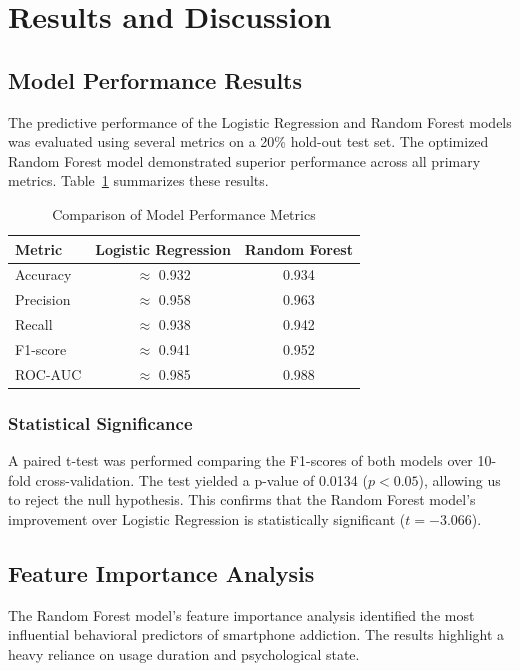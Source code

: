 \section{Results and Discussion}
\label{sec:results_discussion}

\subsection{Model Performance Results}
The predictive performance of the Logistic Regression and Random Forest models was evaluated using several metrics on a 20\% hold-out test set. The optimized Random Forest model demonstrated superior performance across all primary metrics. Table~\ref{tab:model_comparison} summarizes these results.

\begin{table}[h]
\centering
\caption{Comparison of Model Performance Metrics}
\label{tab:model_comparison}
\begin{tabular}{lcc}
\hline
\textbf{Metric} & \textbf{Logistic Regression} & \textbf{Random Forest} \\ \hline
Accuracy         & $\approx$ 0.932             & 0.934                  \\
Precision        & $\approx$ 0.958             & 0.963                  \\
Recall           & $\approx$ 0.938             & 0.942                  \\
F1-score         & $\approx$ 0.941             & 0.952                  \\
ROC-AUC          & $\approx$ 0.985             & 0.988                  \\ \hline
\end{tabular}
\end{table}

\subsubsection{Statistical Significance}
A paired t-test was performed comparing the F1-scores of both models over 10-fold cross-validation. The test yielded a p-value of 0.0134 ($p < 0.05$), allowing us to reject the null hypothesis. This confirms that the Random Forest model's improvement over Logistic Regression is statistically significant ($t = -3.066$).

\subsection{Feature Importance Analysis}
The Random Forest model's feature importance analysis identified the most influential behavioral predictors of smartphone addiction. The results highlight a heavy reliance on usage duration and psychological state.

